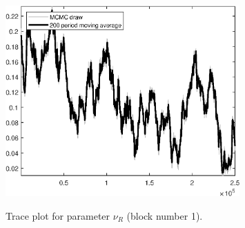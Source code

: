 \begin{figure}[H]
\centering
  \includegraphics[width=0.8\textwidth]{BRS_aggregate/graphs/TracePlot_nu_R_blck_1}\\
    \caption{Trace plot for parameter ${\nu_R}$ (block number 1).}
\end{figure}

